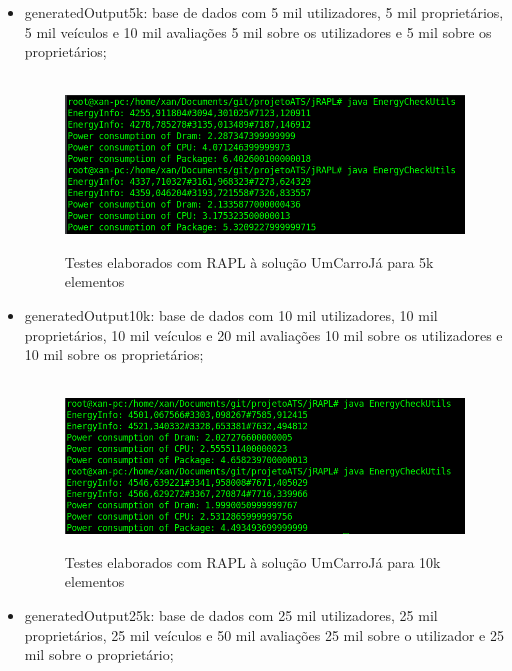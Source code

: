 \begin{itemize}
    \item generatedOutput5k: base de dados com 5 mil utilizadores, 5 mil proprietários, 5 mil veículos e 10 mil avaliações 5 mil sobre os utilizadores e 5 mil sobre os proprietários;\newline
    
        \begin{figure}[H]
            \hbox{\hspace{-8em} \includegraphics[width=1.4\textwidth]{images/rapl_5k.png}}
            \label{fig52}
            \caption{Testes elaborados com RAPL à solução UmCarroJá para 5k elementos}
        \end{figure}
   
    \item generatedOutput10k: base de dados com 10 mil utilizadores, 10 mil proprietários, 10 mil veículos e 20 mil avaliações 10 mil sobre os utilizadores e 10 mil sobre os proprietários;
    
        \begin{figure}[H]
            \hbox{\hspace{-8em} \includegraphics[width=1.4\textwidth]{images/rapl_10k.png}}
            \label{fig53}
            \caption{Testes elaborados com RAPL à solução UmCarroJá para 10k elementos}
        \end{figure}
        
    \item generatedOutput25k: base de dados com 25 mil utilizadores, 25 mil proprietários, 25 mil veículos e 50 mil avaliações 25 mil sobre o utilizador e 25 mil sobre o proprietário;
    

\end{itemize}
